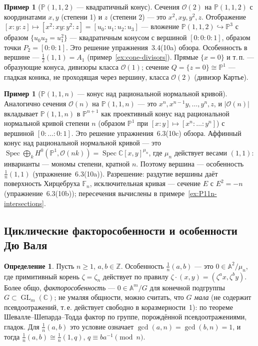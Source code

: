 \documentclass[11pt,a4paper]{article}
\theoremstyle{plain}
\theoremstyle{definition}
\newtheorem{definition}[theorem]{Определение}
\newtheorem{example}[theorem]{Пример}
\theoremstyle{remark}
\renewcommand{\C}{\mathbb{C}}
\newcommand{\Z}{\mathbb{Z}}
\newcommand{\PP}{\mathbb{P}}
\newcommand{\A}{\mathbb{A}}
\newcommand{\cO}{\mathcal{O}}
\DeclareMathOperator{\GL}{GL}
\DeclareMathOperator{\Spec}{Spec}
\begin{document}
\begin{example}[$\PP(1,1,2)$ --- квадратичный конус]\label{ex:P112}
Сечения $\cO(2)$ на $\PP(1,1,2)$ с координатами $x,y$ (степени 1) и $z$ (степени 2) --- это
$x^2,xy,y^2,z$. Отображение $[x:y:z]\mapsto[x^2:xy:y^2:z]=[u_0:u_1:u_2:u_3]$ --- вложение
$\PP(1,1,2)\hookrightarrow\PP^3$ с образом $\{u_0u_2=u_1^2\}$ --- квадратичным конусом с
вершиной $[0:0:0:1]$, образом точки $P_2=[0:0:1]$. Это решение упражнения~3.4(10a) обзора.
Особенность в вершине --- $\frac12(1,1)=A_1$ (пример~\ref{ex:cone-divisors}). Прямые
$\{x=0\}$ и т.\,п. --- образующие конуса, дивизоры класса $\cO(1)$; сечение $Q=\{z=0\}\cong\PP^1$
--- гладкая коника, не проходящая через вершину, класса $\cO(2)$ (дивизор Картье).
\end{example}

\begin{example}[$\PP(1,1,n)$ --- конус над рациональной нормальной кривой]\label{ex:P11n}
Аналогично сечения $\cO(n)$ на $\PP(1,1,n)$ --- это $x^n,x^{n-1}y,\dots,y^n,z$, и
$|\cO(n)|$ вкладывает $\PP(1,1,n)$ в $\PP^{n+1}$ как проективный конус над рациональной
нормальной кривой степени $n$ (образом $\PP^1$ при $[x:y]\mapsto[x^n:\dots:y^n]$) с вершиной
$[0:\dots:0:1]$. Это решение упражнения~6.3(10c) обзора. Аффинный конус над рациональной
нормальной кривой --- это $\Spec\bigoplus_kH^0(\PP^1,\cO(nk))=\Spec\C[x,y]^{\mu_n}$, где $\mu_n$
действует весами $(1,1)$: инварианты --- мономы степени, кратной $n$. Поэтому вершина --- особенность
$\frac1n(1,1)$ (упражнение~6.3(10a)). Разрешение: раздутие вершины даёт поверхность Хирцебруха
$\mathbb F_n$, исключительная кривая --- сечение $E$ с $E^2=-n$ (упражнение~6.3(10b));
пересечения вычислены в примере~\ref{ex:P11n-intersections}.
\end{example}

\subsection{Циклические факторособенности и особенности Дю Валя}\label{ss:quotient}

\begin{definition}\label{def:cyclic-quot}
Пусть $n\ge1$, $a,b\in\Z$. Особенность $\frac1n(a,b)$ --- это $0\in\A^2/\mu_n$, где
примитивный корень $\zeta=\zeta_n$ действует по правилу $\zeta\cdot(x,y)=(\zeta^ax,\zeta^by)$.
Более общо, \emph{факторособенность} --- $0\in\A^m/G$ для конечной подгруппы $G\subset\GL_m(\C)$;
не умаляя общности, можно считать, что $G$ \emph{мала} (не содержит псевдоотражений, т.\,е.
действует свободно в коразмерности~1): по теореме Шевалле--Шепарда--Тодда фактор по группе,
порождённой псевдоотражениями, гладок. Для $\frac1n(a,b)$ это условие означает $\gcd(a,n)=\gcd(b,n)=1$,
и тогда $\frac1n(a,b)\cong\frac1n(1,q)$, $q\equiv ba^{-1}\pmod n$.
\end{definition}
\end{document}
